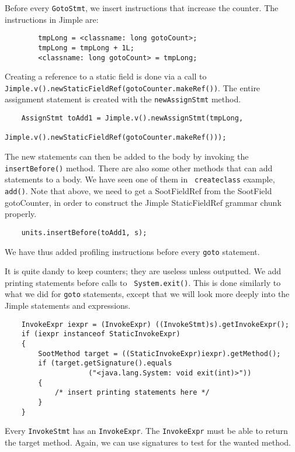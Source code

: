 \documentclass{article}
\begin{document}
Before every {\tt GotoStmt}, we insert instructions that increase the
counter. The instructions in Jimple are:

\begin{verbatim}
        tmpLong = <classname: long gotoCount>;
        tmpLong = tmpLong + 1L;
        <classname: long gotoCount> = tmpLong;
\end{verbatim}

Creating a reference to a static field is done via a call to
{\tt Jimple.v().newStaticFieldRef(gotoCounter.makeRef())}. The entire
assignment statement is created with the {\tt newAssignStmt} method.

\begin{verbatim}
    AssignStmt toAdd1 = Jimple.v().newAssignStmt(tmpLong,
                                Jimple.v().newStaticFieldRef(gotoCounter.makeRef()));
\end{verbatim}

The new statements can then be added to the body by invoking the {\tt
insertBefore()} method.  There are also some other methods that can
add statements to a body.  We have seen one of them in {\tt
createclass} example, {\tt add()}.  Note that above, we need to get a
SootFieldRef from the SootField gotoCounter, in order to construct the
Jimple StaticFieldRef grammar chunk properly.

\begin{verbatim}
    units.insertBefore(toAdd1, s);
\end{verbatim}

We have thus added profiling instructions before every {\tt goto} statement. 

It is quite dandy to keep counters; they are useless unless
outputted. We add printing statements before calls to {\tt
System.exit()}.  This is done similarly to what we did for {\tt goto}
statements, except that we will look more deeply into the Jimple
statements and expressions.

\begin{verbatim}
    InvokeExpr iexpr = (InvokeExpr) ((InvokeStmt)s).getInvokeExpr();
    if (iexpr instanceof StaticInvokeExpr)
    {
        SootMethod target = ((StaticInvokeExpr)iexpr).getMethod();
        if (target.getSignature().equals
                    ("<java.lang.System: void exit(int)>"))
        {
            /* insert printing statements here */
        }
    }
\end{verbatim}

Every {\tt InvokeStmt} has an {\tt InvokeExpr}. The 
{\tt InvokeExpr} must be able to return the target method. 
Again, we can use signatures to test for the wanted method. 
\end{document}
